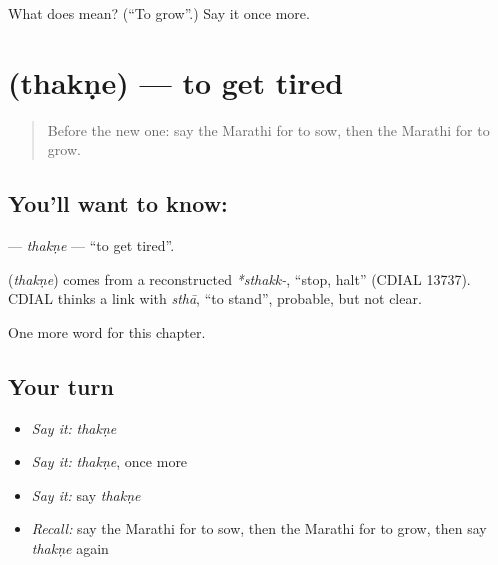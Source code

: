 \begin{tcolorbox}[breakable,colback=teal!4,colframe=teal!35!black,title={Before you move on}]
What does  mean? (\textquotedblleft{}To grow\textquotedblright{}.) Say it once more.
\end{tcolorbox}
\section[\texorpdfstring{\mr{थकणे} (thakṇe)}{थकणे (thakṇe)}]{ (thakṇe) — to get tired}

\label{lesson:MR-C157-thakne}



\begin{quote}
Before the new one: say the Marathi for to sow, then the Marathi for to grow.
\end{quote}

\subsection*{You'll want to know: }
\textbf{} — \emph{thakṇe} — \textquotedblleft{}to get tired\textquotedblright{}.

\begin{cousinweb}
\textbf{} (\emph{thakṇe}) comes from a reconstructed \emph{*sthakk-}, \textquotedblleft{}stop, halt\textquotedblright{} (CDIAL 13737). CDIAL thinks a link with \emph{sthā}, \textquotedblleft{}to stand\textquotedblright{}, probable, but not clear.
\end{cousinweb}

\begin{grammarlens}[title={What you've built}]
One more word for this chapter.
\end{grammarlens}

\subsection*{Your turn}
\begin{itemize}
\raggedright
  \item \emph{Say it:} \emph{thakṇe}
  \item \emph{Say it:} \emph{thakṇe}, once more
  \item \emph{Say it:} say \emph{thakṇe}
  \item \emph{Recall:} say the Marathi for to sow, then the Marathi for to grow, then say \emph{thakṇe} again
\end{itemize}


